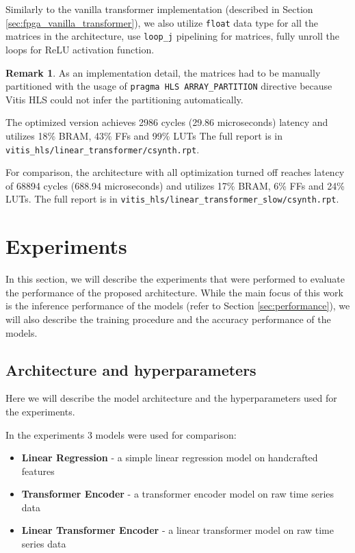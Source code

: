 \documentclass[a4paper, twoside]{report}
\theoremstyle{definition}
\newtheorem{remark}[theorem]{Remark}
\numberwithin{equation}{section}
\begin{document}
Similarly to the vanilla transformer implementation (described in Section \ref{sec:fpga_vanilla_transformer}),
we also utilize \texttt{float} data type for all the matrices in the architecture,
use \texttt{loop\_j} pipelining for matrices, fully unroll the loops for ReLU activation function.

\begin{remark}
    As an implementation detail, the matrices had to be manually partitioned
    with the usage of \texttt{pragma HLS ARRAY\_PARTITION} directive because
    Vitis HLS could not infer the partitioning automatically.
\end{remark}

The optimized version achieves 2986 cycles (29.86 microseconds) latency and utilizes 18\% BRAM, 43\% FFs and 99\% LUTs
\newline
The full report is in \texttt{vitis\_hls/linear\_transformer/csynth.rpt}.

For comparison, the architecture with all optimization turned off reaches latency of 68894 cycles (688.94 microseconds) and utilizes 17\% BRAM, 6\% FFs and 24\% LUTs.
The full report is in \texttt{vitis\_hls/linear\_transformer\_slow/csynth.rpt}.

\chapter{Experiments} \label{sec:experiments}

In this section, we will describe the experiments that were performed to evaluate the performance of the proposed architecture.
While the main focus of this work is the inference performance of the models (refer to Section \ref{sec:performance}),
we will also describe the training procedure and the accuracy performance of the models.

\section{Architecture and hyperparameters} \label{sec:architecture}

Here we will describe the model architecture and the hyperparameters used for the experiments.

In the experiments 3 models were used for comparison:
\begin{itemize}
    \item \textbf{Linear Regression} - a simple linear regression model on handcrafted features
    \item \textbf{Transformer Encoder} - a transformer encoder model on raw time series data
    \item \textbf{Linear Transformer Encoder} - a linear transformer model on raw time series data
\end{itemize}
\end{document}
